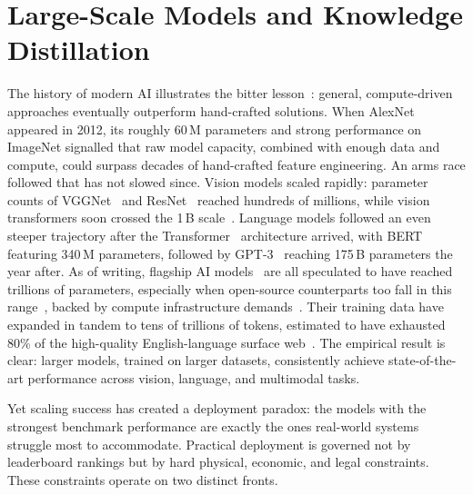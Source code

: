 \documentclass[12pt, a4paper, twoside]{book}
\numberwithin{equation}{chapter}
\theoremstyle{plain}
\theoremstyle{definition}
\theoremstyle{remark}
\newenvironment{foldable}{}{}
\begin{document}
\section{Large-Scale Models and Knowledge Distillation} \label{sec:11-introduction-largescale}
\begin{foldable}
  The history of modern \ac{AI} illustrates the bitter lesson~\cite{sutton2019bitter}: general, compute-driven approaches eventually outperform hand-crafted solutions.
  When AlexNet~\cite{krizhevsky2012imagenet} appeared in 2012, its roughly 60\,M parameters and strong performance on ImageNet signalled that raw model capacity, combined with enough data and compute, could surpass decades of hand-crafted feature engineering.
  An arms race followed that has not slowed since.
  Vision models scaled rapidly: parameter counts of VGGNet~\cite{simonyan2014very} and ResNet~\cite{he2016deep} reached hundreds of millions, while vision transformers soon crossed the 1\,B scale~\cite{dosovitskiy2020image,zhai2022scaling}.
  Language models followed an even steeper trajectory after the Transformer~\cite{vaswani2017attention} architecture arrived, with BERT~\cite{devlin2019bert} featuring 340\,M parameters, followed by GPT-3~\cite{brown2020language} reaching 175\,B parameters the year after.
  As of writing, flagship \ac{AI} models~\cite{anthropic2026assessing,openai2025introducing} are all speculated to have reached trillions of parameters, especially when open-source counterparts too fall in this range~\cite{meta2025llama4,yang2025qwen3}, backed by compute infrastructure demands~\cite{elmeleegy2024demystifying}.
  Their training data have expanded in tandem to tens of trillions of tokens, estimated to have exhausted 80\% of the high-quality English-language surface web~\cite{villalobos2024position}.
  The empirical result is clear: larger models, trained on larger datasets, consistently achieve state-of-the-art performance across vision, language, and multimodal tasks.
\end{foldable}

\begin{foldable}
  Yet scaling success has created a deployment paradox: the models with the strongest benchmark performance are exactly the ones real-world systems struggle most to accommodate.
  Practical deployment is governed not by leaderboard rankings but by hard physical, economic, and legal constraints.
  These constraints operate on two distinct fronts.
\end{foldable}
\end{document}
